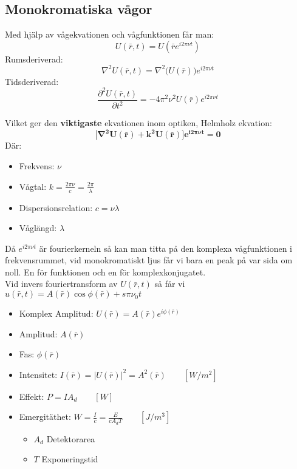 \documentclass{article}
\begin{document}
  \subsection{Monokromatiska vågor}
  Med hjälp av vågekvationen och vågfunktionen får man:
  \begin{equation}
    U(\bar{r},t)=U(\bar{r}e^{i2\pi\nu t})
  \end{equation}
  Rumsderiverad:
  \begin{equation}
    \nabla^2U(\bar{r},t)=\nabla^2\big(U(\bar{r})\big)e^{i2\pi\nu t}
  \end{equation}
  Tidsderiverad:
  \begin{equation}
    \frac{\partial^2U(\bar{r},t)}{\partial t^2} = -4\pi^2\nu^2U(\bar{r})e^{i2\pi\nu t}
  \end{equation}

  Vilket ger den \textbf{viktigaste} ekvationen inom optiken, Helmholz ekvation:
  \begin{equation}
    \mathbf{\bigg[\nabla^2U(\bar{r})+k^2U(\bar{r})\bigg]e^{i2\pi\nu t} = 0}
  \end{equation}
  Där:
  \begin{itemize}
    \item Frekvens: $\nu$
    \item Vågtal: $k=\frac{2\pi\nu}{c}=\frac{2\pi}{\lambda}$
    \item Dispersionsrelation: $c=\nu\lambda$
    \item Våglängd: $\lambda$
  \end{itemize}

  Då $e^{i2\pi\nu t}$ är fourierkerneln så kan man titta på den komplexa vågfunktionen i frekvensrummet, vid monokromatiskt ljus får vi bara en peak på var sida om noll. En för funktionen och en för komplexkonjugatet.\\

  Vid invers fouriertransform av $U(\bar{r},t)$ så får vi $u(\bar{r},t)=A(\bar{r})\cos{\phi(\bar{r})+s\pi\nu_0t}$\\

  \begin{itemize}
    \item Komplex Amplitud: $U(\bar{r})=A(\bar{r})e^{i\phi(\bar{r})}$
    \item Amplitud: $A(\bar{r})$
    \item Fas: $\phi(\bar{r})$
    \item Intensitet: $I(\bar{r})=|U(\bar{r})|^2=A^2(\bar{r})\qquad [W/m^2]$
    \item Effekt: $P = IA_d\qquad[W]$
    \item Emergitäthet: $W=\frac{I}{c}=\frac{E}{cA_dT}\qquad[J/m^3]$
    \begin{itemize}
      \item $A_d$ Detektorarea
      \item $T$ Exponeringstid
    \end{itemize}
  \end{itemize}
\end{document}
